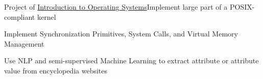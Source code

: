 {Project of \href{http://www.ops-class.org/asst/}{Introduction to Operating Systems}}{Implement large part of a POSIX-compliant kernel}{}{}
{
  \begin{tightitemize}
      \item Implement Synchronization Primitives, System Calls, and Virtual Memory Management
  \end{tightitemize}
}

{
  \begin{tightitemize}
      \item Use NLP and semi-supervised Machine Learning to extract attribute or attribute value from encyclopedia websites
  \end{tightitemize}
}

